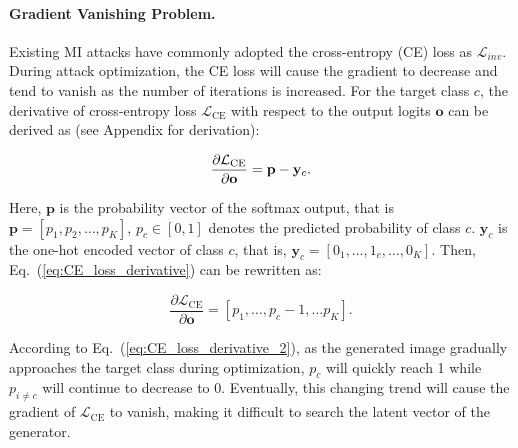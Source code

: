 \documentclass[letterpaper]{article} %
\newcommand{\Eref}[1]{Eq.~(\ref{#1})}
\begin{document}
\paragraph{Gradient Vanishing Problem.}
Existing MI attacks have commonly adopted the cross-entropy (CE) loss as $\mathcal{L}_{inv}$. During attack optimization, the CE loss will cause the gradient to decrease and tend to vanish as the number of iterations is increased.
For the target class $c$, the derivative of cross-entropy loss $\mathcal{L}_{\text{CE}}$ with respect to the output logits $\mathbf{o}$ can be derived as (see Appendix for derivation):
\begin{linenomath*}
\begin{equation}\label{eq:CE_loss_derivative}
\frac{\partial  \mathcal{L}_{\text{CE}}}{\partial \mathbf{o}}=\mathbf{p}-\mathbf{y}_{c}. \\
\end{equation}
\end{linenomath*}
Here, $\mathbf{p}$ is the probability vector of the softmax output, that is $\mathbf{p}=\left[p_{1}, p_{2}, \dots ,p_{K}\right]$, $p_c \in [0,1]$ denotes the predicted probability of class $c$. $\mathbf{y}_{c}$ is the one-hot encoded vector of class $c$, that is, $\mathbf{y}_{c}=\left[0_{1}, \dots, 1_{c}, \dots ,0_{K}\right]$. Then,  \Eref{eq:CE_loss_derivative} can be rewritten as:
\begin{linenomath*}
\begin{equation}\label{eq:CE_loss_derivative_2}
\frac{\partial  \mathcal{L}_{\text{CE}}}{\partial \mathbf{o}} =\left[p_{1}, \dots, p_{c}-1, \dots p_{K}\right].
\end{equation}
\end{linenomath*}
According to \Eref{eq:CE_loss_derivative_2}, as the generated image gradually approaches the target class during optimization, $p_c$ will quickly reach 1 while $p_{i \neq c}$ will continue to decrease to 0. Eventually, this changing trend will cause the gradient of $\mathcal{L}_\text{CE}$ to vanish, making it difficult to search the latent vector of the generator.
\end{document}
